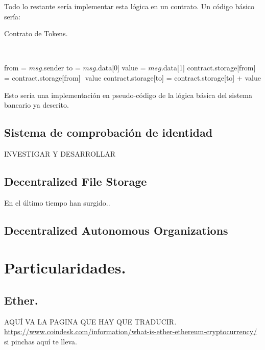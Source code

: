 \documentclass[11pt,a4paper]{article}
\begin{document}
Todo lo restante sería implementar esta lógica en un contrato. Un código básico sería:\\


\begin{algorithm}
  \caption{Contrato de Tokens.}\label{token}
  \begin{algorithmic}[1]
    			\\ 
    
    \State from = $msg$.sender
    \State to = $msg$.data[0]
    \State value = $msg$.data[1]
    \State contract.storage[from] = contract.storage[from] ­ value
    \State contract.storage[to] = contract.storage[to] + value
    \EndIf
    \EndProcedure
  \end{algorithmic}
\end{algorithm}

Esto sería una implementación en pseudo-código de la lógica básica del sistema bancario ya descrito.


\subsection{Sistema de comprobación de identidad}

INVESTIGAR Y DESARROLLAR

\subsection{Decentralized File Storage}

En el último tiempo han surgido..


\subsection{Decentralized Autonomous Organizations}
\label{sec:dao}

\section{Particularidades.}

\subsection{Ether.}
\label{sec:ether}

AQUÍ VA LA PAGINA QUE HAY QUE TRADUCIR.	\\
\url{https://www.coindesk.com/information/what-is-ether-ethereum-cryptocurrency/}	\\
si pinchas aquí te lleva.
\end{document}
